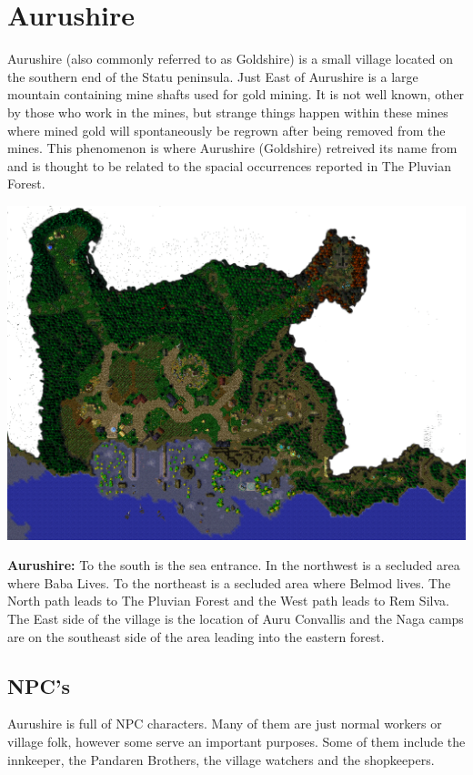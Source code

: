 \section{Aurushire}

Aurushire (also commonly referred to as Goldshire) is a small village located on the southern end of the Statu peninsula. Just East of Aurushire is a large mountain containing mine shafts used for gold mining. It is not well known, other by those who work in the mines, but strange things happen within these mines where mined gold will spontaneously be regrown after being removed from the mines. This phenomenon is where Aurushire (Goldshire) retreived its name from and is thought to be related to the spacial occurrences reported in The Pluvian Forest. 

\begin{center}
	\includegraphics[width=\linewidth]{img/maps/Aurushire.png}
	
	{\textbf{Aurushire:} To the south is the sea entrance. In the northwest is a secluded area where Baba Lives. To the northeast is a secluded area where Belmod lives. The North path leads to The Pluvian Forest and the West path leads to Rem Silva. The East side of the village is the location of Auru Convallis and the Naga camps are on the southeast side of the area leading into the eastern forest.}
\end{center}

\subsection{NPC's}

Aurushire is full of NPC characters. Many of them are just normal workers or village folk, however some serve an important purposes. Some of them include the innkeeper, the Pandaren Brothers, the village watchers and the shopkeepers.

